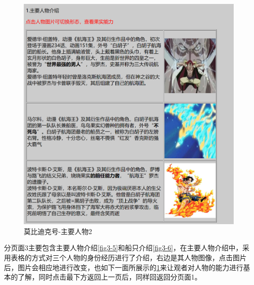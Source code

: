\documentclass[supercite]{Experimental_Report}
\theoremstyle{definition}
\begin{document}
\begin{figure}[htp]
	\begin{center}
		\includegraphics[scale=0.40]{images/fen3.3.png}
		\caption{莫比迪克号-主要人物2}
		\label{fig3-7}
	\end{center}
\end{figure}

分页面3主要包含主要人物介绍\textcolor{blue}{\ref{fig3-5}}和船只介绍\textcolor{blue}{\ref{fig3-6}}，在主要人物介绍中，采用表格的方式对三个人物的身份经历进行了介绍，右边是其人物图像，点击图片后，图片会相应地进行改变，也如下一面所展示的\textcolor{blue}{\ref{fig3-7}}来让观者对人物的能力进行基本的了解，同时点击最下方返回上一页后，同样回返回分页面1。
\newpage
\end{document}
